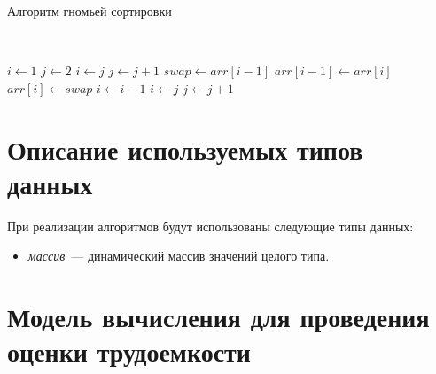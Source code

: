 \begin{algorithm}[H]
    \caption{Алгоритм гномьей сортировки}
    \label{alg:gnome-sort}
    \\

    \begin{algorithmic}[1]
        \State $i\gets 1$
        \State $j\gets 2$
                \State $i\gets j$
                \State $j\gets j + 1$
            \Else
                \State $swap\gets arr[i - 1]$
                \State $arr[i - 1]\gets arr[i]$
                \State $arr[i]\gets swap$
                \State $i\gets i - 1$
                    \State $i\gets j$
                    \State $j\gets j + 1$
                \EndIf
            \EndIf
        \EndWhile
        \EndProcedure
    \end{algorithmic}
\end{algorithm}

\section{Описание используемых типов данных}

При реализации алгоритмов будут использованы следующие типы данных:
\begin{itemize}
    \item \textit{массив}~--- динамический массив значений целого типа.
\end{itemize}

\section{Модель вычисления для проведения оценки трудоемкости}

